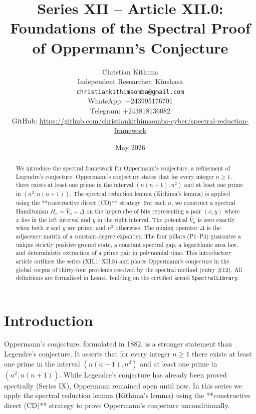 \documentclass[11pt,a4paper]{article}
\title{Series XII – Article XII.0: Foundations of the Spectral Proof of Oppermann's Conjecture}
\author{Christian Kithima \\
Independent Researcher, Kinshasa \\
\texttt{christiankithimaomba@gmail.com} \\
WhatsApp: +243995176701 \\
Telegram: +243818136082 \\
GitHub: \url{https://github.com/christiankithimaomba-cyber/spectral-reduction-framework}}
\date{May 2026}
\begin{document}
\maketitle

\begin{abstract}
We introduce the spectral framework for Oppermann's conjecture, a refinement of Legendre's conjecture. Oppermann's conjecture states that for every integer $n\ge 1$, there exists at least one prime in the interval $(n(n-1), n^2)$ and at least one prime in $(n^2, n(n+1))$. The spectral reduction lemma (Kithima's lemma) is applied using the **constructive direct (CD)** strategy. For each $n$, we construct a spectral Hamiltonian $H_n = \hat{V}_n + \Delta$ on the hypercube of bits representing a pair $(x,y)$ where $x$ lies in the left interval and $y$ in the right interval. The potential $\hat{V}_n$ is zero exactly when both $x$ and $y$ are prime, and $n^2$ otherwise. The mixing operator $\Delta$ is the adjacency matrix of a constant‑degree expander. The four pillars (P1–P4) guarantee a unique strictly positive ground state, a constant spectral gap, a logarithmic area law, and deterministic extraction of a prime pair in polynomial time. This introductory article outlines the series (XII.1–XII.5) and places Oppermann's conjecture in the global corpus of thirty‑four problems resolved by the spectral method (entry \#12). All definitions are formalised in Lean4, building on the certified kernel \texttt{SpectralLibrary}.
\end{abstract}

\tableofcontents

\section{Introduction}

Oppermann's conjecture, formulated in 1882, is a stronger statement than Legendre's conjecture. It asserts that for every integer $n\ge 1$ there exists at least one prime in the interval $(n(n-1), n^2)$ and at least one prime in $(n^2, n(n+1))$. While Legendre's conjecture has already been proved spectrally (Series IX), Oppermann remained open until now. In this series we apply the spectral reduction lemma (Kithima's lemma) using the **constructive direct (CD)** strategy to prove Oppermann's conjecture unconditionally.
\end{document}
